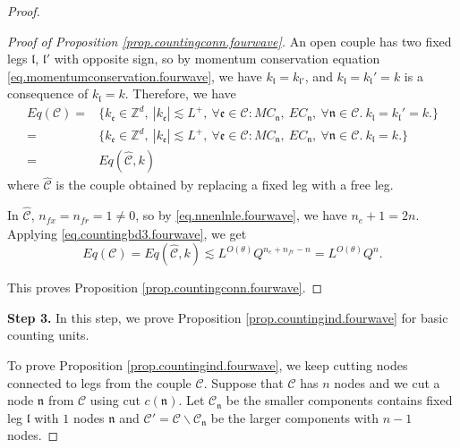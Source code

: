 \begin{proof}
\begin{proof}[Proof of Proposition \ref{prop.countingconn.fourwave}]
    An open couple has two fixed legs $\mathfrak{l}$, $\mathfrak{l}'$ with opposite sign, so by momentum conservation equation \eqref{eq.momentumconservation.fourwave}, we have $k_{\mathfrak{l}}=k_{\mathfrak{l}'}$, and $k_{\mathfrak{l}}=k_{\mathfrak{l}}'=k$ is a consequence of $k_{\mathfrak{l}}=k$. Therefore, we have 
    \begin{equation}\label{eq.stephatC.fourwave}
    \begin{split}
     Eq(\mathcal{C})=&\{k_{\mathfrak{e}}\in \mathbb{Z}^d,\ |k_{\mathfrak{e}}| \lesssim L^+,\ \forall \mathfrak{e}\in \mathcal{C}:MC_{\mathfrak{n}},\  EC_{\mathfrak{n}},\ \forall \mathfrak{n}\in \mathcal{C}.\ k_{\mathfrak{l}}=k_{\mathfrak{l}}'=k.\} 
     \\
     =& \{k_{\mathfrak{e}}\in \mathbb{Z}^d,\ |k_{\mathfrak{e}}| \lesssim L^+,\ \forall \mathfrak{e}\in \mathcal{C}:MC_{\mathfrak{n}},\  EC_{\mathfrak{n}},\ \forall \mathfrak{n}\in \mathcal{C}.\ k_{\mathfrak{l}}=k.\} 
     \\
     =&Eq(\widehat{\mathcal{C}},k)
    \end{split}
    \end{equation}
    where $\widehat{\mathcal{C}}$ is the couple obtained by replacing a fixed leg with a free leg.
    
    In $\widehat{\mathcal{C}}$, $n_{\textit{fx}}=n_{\textit{fr}}=1\ne 0$, so by \eqref{eq.nnenlnle.fourwave}, we have $n_e+1=2n$. Applying \eqref{eq.countingbd3.fourwave}, we get
    \begin{equation}\label{eq.stephatC'.fourwave}
     Eq(\mathcal{C})=Eq(\widehat{\mathcal{C}},k)\lesssim L^{O(\theta)} Q^{n_e+n_{\textit{fr}}-n} = L^{O(\theta)} Q^{n}.
    \end{equation}
    
    This proves Proposition \ref{prop.countingconn.fourwave}.
    \end{proof}
    
    
    \textbf{Step 3.} In this step, we prove Proposition \ref{prop.countingind.fourwave} for basic counting units.
    
    To prove Proposition \ref{prop.countingind.fourwave}, we keep cutting nodes connected to legs from the couple $\mathcal{C}$. Suppose that $\mathcal{C}$ has $n$ nodes and we cut a node $\mathfrak{n}$ from $\mathcal{C}$ using cut $c(\mathfrak{n})$. Let $\mathcal{C}_{\mathfrak{n}}$ be the smaller components contains fixed leg $\mathfrak{l}$ with $1$ nodes $\mathfrak{n}$ and $\mathcal{C}' = \mathcal{C}\backslash \mathcal{C}_{\mathfrak{n}}$ be the larger components with $n-1$ nodes.
    

\end{proof}
